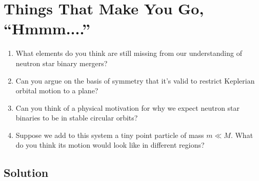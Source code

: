 \documentclass[11pt]{article}
\begin{document}
\section*{Things That Make You Go, ``Hmmm....''}

\begin{enumerate}

\item What elements do you think are still missing from our understanding of neutron star binary mergers?

\item Can you argue on the basis of symmetry that it's valid to restrict Keplerian orbital motion to a plane?

\item Can you think of a physical motivation for why we expect neutron star binaries to be in stable circular orbits?

\item Suppose we add to this system a tiny point particle of mass $m \ll M$. What do you think its motion would look like in different regions?

\end{enumerate}


\vspace{1000pt}

\subsection*{Solution}
\end{document}
